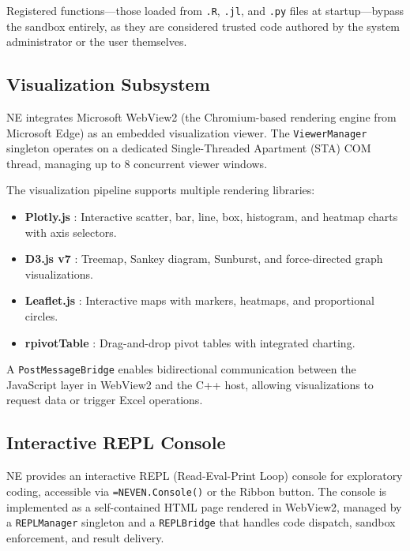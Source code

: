 \documentclass[preprint,12pt,authoryear]{elsarticle}
\newcommand{\neven}{NE\raisebox{0.2ex}{v}\rotatebox[origin=c]{180}{E}\rotatebox[origin=c]{180}{N}}
\begin{document}
Registered functions---those loaded from \texttt{.R}, \texttt{.jl}, and \texttt{.py} files at startup---bypass the sandbox entirely, as they are considered trusted code authored by the system administrator or the user themselves.

\subsection{Visualization Subsystem}

\neven{} integrates Microsoft WebView2 \citep{WebView2_2023} (the Chromium-based rendering engine from Microsoft Edge) as an embedded visualization viewer. The \texttt{ViewerManager} singleton operates on a dedicated Single-Threaded Apartment (STA) COM thread, managing up to 8 concurrent viewer windows.

The visualization pipeline supports multiple rendering libraries:
\begin{itemize}
    \item \textbf{Plotly.js} \citep{Plotly2023}: Interactive scatter, bar, line, box, histogram, and heatmap charts with axis selectors.
    \item \textbf{D3.js v7} \citep{Bostock2011}: Treemap, Sankey diagram, Sunburst, and force-directed graph visualizations.
    \item \textbf{Leaflet.js} \citep{Leaflet2023}: Interactive maps with markers, heatmaps, and proportional circles.
    \item \textbf{rpivotTable} \citep{rpivotTable2023}: Drag-and-drop pivot tables with integrated charting.
\end{itemize}

A \texttt{PostMessageBridge} enables bidirectional communication between the JavaScript layer in WebView2 and the C++ host, allowing visualizations to request data or trigger Excel operations.

\subsection{Interactive REPL Console}
\label{subsec:repl}

\neven{} provides an interactive REPL (Read-Eval-Print Loop) console for exploratory coding, accessible via \texttt{=NEVEN.Console()} or the Ribbon button. The console is implemented as a self-contained HTML page rendered in WebView2, managed by a \texttt{REPLManager} singleton and a \texttt{REPLBridge} that handles code dispatch, sandbox enforcement, and result delivery.
\end{document}
